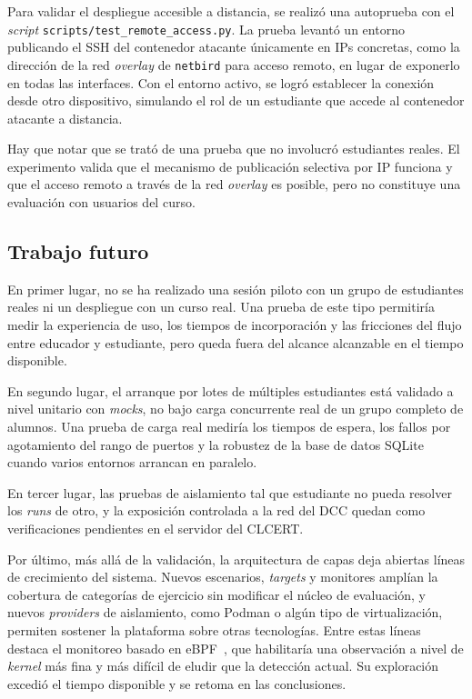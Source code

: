 Para validar el despliegue accesible a distancia, se realizó una autoprueba con
el \textit{script} \texttt{scripts/test\_remote\_access.py}. La prueba levantó
un entorno publicando el SSH del contenedor atacante únicamente en IPs
concretas, como la dirección de la red \textit{overlay} de \texttt{netbird}
\cite{netbird} para acceso remoto, en lugar de exponerlo en todas las
interfaces. Con el entorno activo, se logró establecer la conexión desde otro
dispositivo, simulando el rol de un estudiante que accede al contenedor atacante
a distancia.

Hay que notar que se trató de una prueba que no involucró estudiantes reales. 
El experimento valida que el mecanismo de
publicación selectiva por IP funciona y que el acceso remoto a través de la red
\textit{overlay} es posible, pero no constituye una evaluación con usuarios del
curso.


\subsection{Trabajo futuro}
\label{sec:trabajo-futuro-validacion}

En primer lugar, no se ha realizado una sesión piloto con un grupo de
estudiantes reales ni un despliegue con un curso real. Una prueba de este tipo
permitiría medir la experiencia de uso, los tiempos de incorporación y las
fricciones del flujo entre educador y estudiante, pero queda fuera del alcance
alcanzable en el tiempo disponible.

En segundo lugar, el arranque por lotes de múltiples estudiantes está validado a
nivel unitario con \textit{mocks}, no bajo carga concurrente real de un grupo
completo de alumnos. Una prueba de carga real mediría los tiempos de espera, los
fallos por
agotamiento del rango de puertos y la robustez de la base de datos SQLite
cuando varios entornos arrancan en paralelo.

En tercer lugar, las pruebas de aislamiento tal que estudiante no pueda resolver
los \textit{runs} de otro, y la exposición controlada a la red del DCC quedan
como verificaciones pendientes en el servidor del CLCERT.

Por último, más allá de la validación, la arquitectura de capas deja abiertas
líneas de crecimiento del sistema. Nuevos escenarios, \textit{targets} y
monitores amplían la cobertura de categorías de ejercicio sin modificar el
núcleo de evaluación, y nuevos \textit{providers} de aislamiento, como Podman
o algún tipo de virtualización, permiten sostener la plataforma sobre otras
tecnologías. Entre estas líneas destaca el monitoreo basado en
eBPF~\cite{ebpf}, que habilitaría una observación a nivel de \textit{kernel} más
fina y más difícil de eludir que la detección actual. Su exploración excedió el
tiempo disponible y se retoma en las conclusiones.


